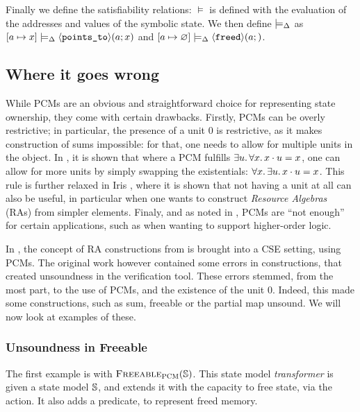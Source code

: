  Finally we define the satisfiability relations: $\models$ is defined with the evaluation of the addresses and values of the symbolic state. We then define $\models_{\Delta}$ as ${[a\mapsto x]\models_{\Delta} \left<\texttt{points\_to}\right>\!(a;x)}$ and ${[a\mapsto\varnothing]\models_{\Delta}\left<\texttt{freed}\right>\!(a;)}$.

\subsection{Where it goes wrong}

While PCMs are an obvious and straightforward choice for representing state ownership, they come with certain drawbacks. Firstly, PCMs can be overly restrictive; in particular, the presence of a unit $0$ is restrictive, as it makes construction of sums impossible: for that, one needs to allow for multiple units in the object. In \cite{sepalgebra}, it is shown that where a PCM fulfills $\exists u\ldotp \forall x\ldotp x\cdot u = x$, one can allow for more units by simply swapping the existentials: $\forall x\ldotp \exists u\ldotp x \cdot u = x$. This rule is further relaxed in Iris \cite{iris}, where it is shown that not having a unit at all can also be useful, in particular when one wants to construct \emph{Resource Algebras} (RAs) from simpler elements. Finaly, and as noted in \cite{iris}, PCMs are ``not enough'' for certain applications, such as when wanting to support higher-order logic.

In \cite{sacha-phd}, the concept of RA constructions from \cite{iris} is brought into a CSE setting, using PCMs. The original work however contained some errors in constructions, that created unsoundness in the verification tool. These errors stemmed, from the most part, to the use of PCMs, and the existence of the unit $0$. Indeed, this made some constructions, such as sum, freeable or the partial map unsound. We will now look at examples of these.

\subsubsection{Unsoundness in Freeable}

The first example is with $\textsc{Freeable}_{\textsc{PCM}}(\mathbb S)$. This state model \emph{transformer} is given a state model $\mathbb S$, and extends it with the capacity to free state, via the \free{} action. It also adds a \freedP{} predicate, to represent freed memory. 


